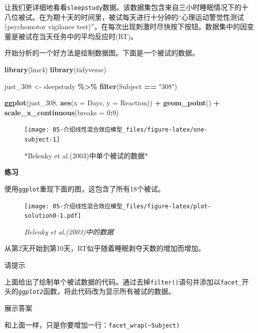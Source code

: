 \documentclass[
]{book}
\newenvironment{Shaded}{\begin{snugshade}}{\end{snugshade}}
\newcommand{\AttributeTok}[1]{\textcolor[rgb]{0.13,0.29,0.53}{#1}}
\newcommand{\DecValTok}[1]{\textcolor[rgb]{0.00,0.00,0.81}{#1}}
\newcommand{\FunctionTok}[1]{\textcolor[rgb]{0.13,0.29,0.53}{\textbf{#1}}}
\newcommand{\NormalTok}[1]{#1}
\newcommand{\OtherTok}[1]{\textcolor[rgb]{0.56,0.35,0.01}{#1}}
\newcommand{\SpecialCharTok}[1]{\textcolor[rgb]{0.81,0.36,0.00}{\textbf{#1}}}
\newcommand{\StringTok}[1]{\textcolor[rgb]{0.31,0.60,0.02}{#1}}
\begin{document}
让我们更详细地看看\texttt{sleepstudy}数据。该数据集包含来自三小时睡眠情况下的十八位被试。在为期十天的时间里，被试每天进行十分钟的``心理运动警觉性测试(psychomotor vigilance test)''，在每次出现刺激时尽快按下按钮。数据集中的因变量是被试在当天任务中的平均反应时(RT)。

开始分析的一个好方法是绘制数据图。下面是一个被试的数据。

\begin{Shaded}
\begin{Highlighting}[]
\FunctionTok{library}\NormalTok{(lme4)}
\FunctionTok{library}\NormalTok{(tidyverse)}

\NormalTok{just\_308 }\OtherTok{\textless{}{-}}\NormalTok{ sleepstudy }\SpecialCharTok{\%\textgreater{}\%}
  \FunctionTok{filter}\NormalTok{(Subject }\SpecialCharTok{==} \StringTok{"308"}\NormalTok{)}

\FunctionTok{ggplot}\NormalTok{(just\_308, }\FunctionTok{aes}\NormalTok{(}\AttributeTok{x =}\NormalTok{ Days, }\AttributeTok{y =}\NormalTok{ Reaction)) }\SpecialCharTok{+}
  \FunctionTok{geom\_point}\NormalTok{() }\SpecialCharTok{+}
  \FunctionTok{scale\_x\_continuous}\NormalTok{(}\AttributeTok{breaks =} \DecValTok{0}\SpecialCharTok{:}\DecValTok{9}\NormalTok{)}
\end{Highlighting}
\end{Shaded}

\begin{figure}
\texttt{[image: 05-介绍线性混合效应模型\_files/figure-latex/one-subject-1]} \caption{*Belenky et al.(2003)中单个被试的数据*}\label{fig:one-subject}
\end{figure}

\textbf{练习}

使用\texttt{ggplot}重现下面的图，这包含了所有18个被试。

\begin{figure}
\centering
\texttt{[image: 05-介绍线性混合效应模型\_files/figure-latex/plot-solution0-1.pdf]}
\caption{\label{fig:plot-solution0}\emph{Belenky et al.(2003)中的数据}}
\end{figure}

从第2天开始到第10天，RT似乎随着睡眠剥夺天数的增加而增加。

请提示

上面给出了绘制单个被试数据的代码。通过去掉\texttt{filter()}语句并添加以\texttt{facet\_}开头的\emph{\texttt{ggplot2}}函数，将此代码改为显示所有被试的数据。

展示答案

和上面一样，只是你要增加一行：\texttt{facet\_wrap(\textasciitilde{}Subject)}
\end{document}
